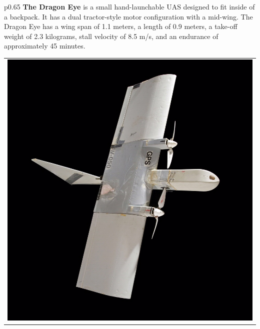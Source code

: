 \documentclass[]{article}
\begin{document}
\begin{table}[H]
\begin{minipage}[b]{0.65\linewidth}
\begin{tabular}{*{1}{p{0.65\textwidth}}}
{\bf The Dragon Eye} is a small hand-launchable UAS designed to fit inside of a backpack.  It has a dual tractor-style motor configuration with a mid-wing.  The Dragon Eye has a wing span of 1.1 meters, a length of 0.9 meters, a take-off weight of 2.3 kilograms, stall velocity of 8.5 m/s, and an endurance of approximately 45 minutes.
\end{tabular}
\end{minipage}
\hfill
\begin{minipage}[b]{0.5\linewidth}
\begin{tabular}{*{1}{p{}}}
\includegraphics[height=8\baselineskip]{dragoneye}
\end{tabular}
\end{minipage}
\end{table}
\end{document}
